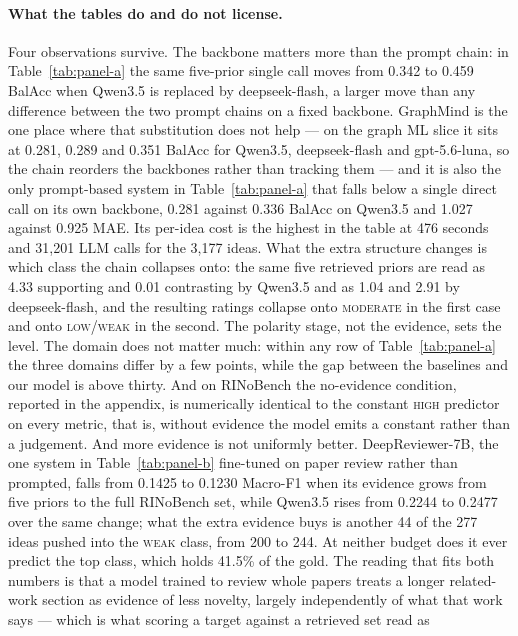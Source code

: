 \paragraph{What the tables do and do not license.}
Four observations survive. The backbone matters more than the prompt chain: in
Table~\ref{tab:panel-a} the same five-prior single call moves from 0.342 to 0.459
BalAcc when Qwen3.5 is replaced by deepseek-flash, a larger move than any
difference between the two prompt chains on a fixed backbone. GraphMind is the
one place where that substitution does not help --- on the graph ML slice it
sits at 0.281, 0.289 and 0.351 BalAcc for Qwen3.5, deepseek-flash and
gpt-5.6-luna, so the chain reorders the backbones rather than tracking them ---
and it is also the only prompt-based system in Table~\ref{tab:panel-a} that
falls below a single direct call on its own backbone, 0.281 against 0.336 BalAcc
on Qwen3.5 and 1.027 against 0.925 MAE. Its per-idea cost is the highest in the
table at 476 seconds and 31{,}201 LLM calls for the 3{,}177 ideas. What the
extra structure changes is which class the chain collapses onto: the same five
retrieved priors are read as 4.33 supporting and 0.01 contrasting by Qwen3.5 and
as 1.04 and 2.91 by deepseek-flash, and the resulting ratings collapse onto
\textsc{moderate} in the first case and onto \textsc{low}/\textsc{weak} in the
second. The polarity stage, not the evidence, sets the level. The domain does
not matter much: within any row of Table~\ref{tab:panel-a} the three domains
differ by a few points, while the gap between the baselines and our model is
above thirty. And on RINoBench the no-evidence condition, reported in the
appendix, is numerically identical to the constant \textsc{high} predictor on
every metric, that is, without evidence the model emits a constant rather than a
judgement. And more evidence is not uniformly better. DeepReviewer-7B, the one
system in Table~\ref{tab:panel-b} fine-tuned on paper review rather than
prompted, falls from 0.1425 to 0.1230 Macro-F1 when its evidence grows from five
priors to the full RINoBench set, while Qwen3.5 rises from 0.2244 to 0.2477 over
the same change; what the extra evidence buys is another 44 of the 277 ideas
pushed into the \textsc{weak} class, from 200 to 244. At neither budget does it
ever predict the top class, which holds 41.5\% of the gold. The reading that fits
both numbers is that a model trained to review whole papers treats a longer
related-work section as evidence of less novelty, largely independently of what
that work says --- which is what scoring a target against a retrieved set read as
